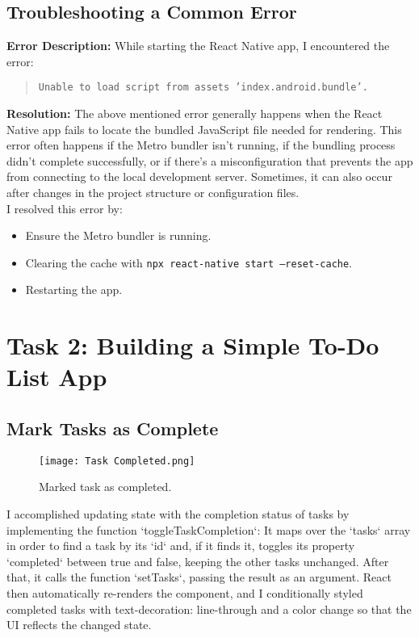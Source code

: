 \documentclass[a4paper,12pt]{article}
\begin{document}
\subsection{Troubleshooting a Common Error}
\textbf{Error Description:}
While starting the React Native app, I encountered the error:
\begin{quote}
    \texttt{Unable to load script from assets 'index.android.bundle'.}
\end{quote}

\textbf{Resolution:}
The above mentioned error generally happens when the React Native app fails to locate the bundled JavaScript file needed for rendering. This error often happens if the Metro bundler isn’t running, if the bundling process didn’t complete successfully, or if there’s a misconfiguration that prevents the app from connecting to the local development server. Sometimes, it can also occur after changes in the project structure or configuration files.
\\
I resolved this error by:
\begin{itemize}
    \item Ensure the Metro bundler is running.
    \item Clearing the cache with \texttt{npx react-native start --reset-cache}.
    \item Restarting the app.
\end{itemize}

\section{Task 2: Building a Simple To-Do List App }
\subsection{Mark Tasks as Complete}
\begin{figure}[H]
    \centering
    \texttt{[image: Task Completed.png]}
    \caption{Marked task as completed.}
    \label{fig:emulator}
\end{figure}
I accomplished updating state with the completion status of tasks by implementing the function `toggleTaskCompletion`: It maps over the `tasks` array in order to find a task by its `id` and, if it finds it, toggles its property `completed` between true and false, keeping the other tasks unchanged. After that, it calls the function `setTasks`, passing the result as an argument. React then automatically re-renders the component, and I conditionally styled completed tasks with text-decoration: line-through and a color change so that the UI reflects the changed state.
\end{document}
